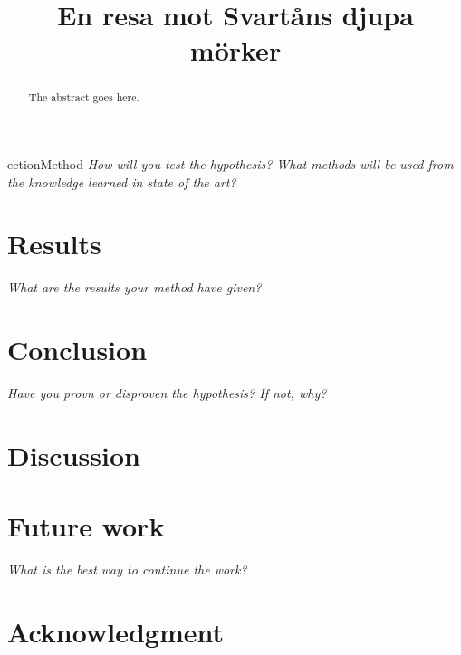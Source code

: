 \documentclass[conference]{IEEEtran}
\begin{document}
\title{En resa mot Svartåns djupa mörker}

\author{
\and
}

\maketitle

\begin{abstract}
The abstract goes here.
\end{abstract}
ection{Method}
\textit{How will you test the hypothesis? What methods will be used from the knowledge learned in state of the art?}
\section{Results}
\textit{What are the results your method have given?}
\section{Conclusion}
\textit{Have you provn or disproven the hypothesis? If not, why?}
\section{Discussion}

\section{Future work}
\textit{What is the best way to continue the work?}


\section*{Acknowledgment}






\end{document}
